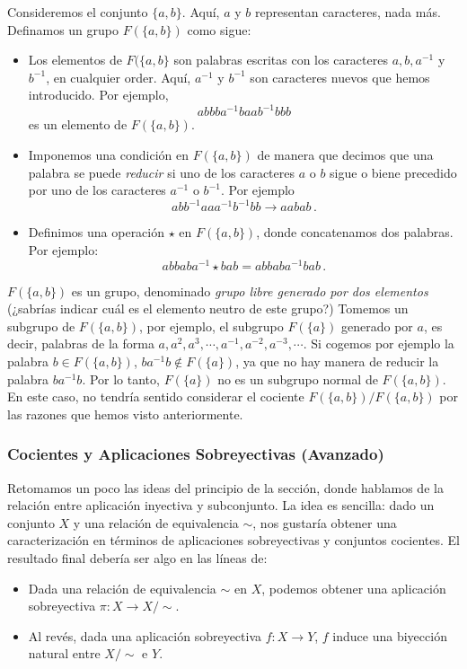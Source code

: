 \documentclass[a4paper,11pt]{amsart}
\theoremstyle{plain}
\theoremstyle{definition}
\theoremstyle{remark}
\begin{document}
Consideremos el conjunto $\{a, b\}$. Aquí, $a$ y $b$ representan caracteres, nada más. Definamos un grupo $F(\{a, b\})$ como sigue: 
\begin{itemize}
    \item Los elementos de $F(\{a, b\}$ son palabras escritas con los caracteres $a, b, a^{-1}$ y $b^{-1}$, en cualquier order. Aquí, $a^{-1}$ y $b^{-1}$ son caracteres nuevos que hemos introducido. Por ejemplo, 
    \[ abbba^{-1}baab^{-1}bbb \]
    es un elemento de $F(\{a, b\})$.
    \item Imponemos una condición en $F(\{a, b\})$ de manera que decimos que una palabra se puede \textit{reducir} si uno de los caracteres $a$ o $b$ sigue o biene precedido por uno de los caracteres $a^{-1}$ o $b^{-1}$. Por ejemplo 
    \[ abb^{-1}aaa^{-1}b^{-1}bb \to aabab \, .\]
    \item Definimos una operación $\star$ en $F(\{a, b\})$, donde concatenamos dos palabras. Por ejemplo: 
    \[ abbaba^{-1} \star bab = abbaba^{-1}bab \, .\]
\end{itemize}

$F(\{a,b \})$ es un grupo, denominado \textit{grupo libre generado por dos elementos} (¿sabrías indicar cuál es el elemento neutro de este grupo?) Tomemos un subgrupo de $F(\{ a, b \})$, por ejemplo, el subgrupo $F(\{a\})$ generado por $a$, es decir, palabras de la forma $a, a^2, a^3, \cdots , a^{-1}, a^{-2}, a^{-3}, \cdots $. Si cogemos por ejemplo la palabra $b \in F(\{a, b\})$, $b a^{-1} b \notin F(\{a\})$, ya que no hay manera de reducir la palabra $b a^{-1} b$. Por lo tanto, $F(\{a\})$ no es un subgrupo normal de $F(\{a, b\})$. En este caso, no tendría sentido considerar el cociente $F(\{a, b\})/F(\{a, b\})$ por las razones que hemos visto anteriormente. 



\subsubsection{Cocientes y Aplicaciones Sobreyectivas (Avanzado)}

Retomamos un poco las ideas del principio de la sección, donde hablamos de la relación entre aplicación inyectiva y subconjunto. La idea es sencilla: dado un conjunto $X$ y una relación de equivalencia $\sim$, nos gustaría obtener una caracterización en términos de aplicaciones sobreyectivas y conjuntos cocientes. El resultado final debería ser algo en las líneas de: 
\begin{itemize}
    \item Dada una relación de equivalencia $\sim$ en $X$, podemos obtener una aplicación sobreyectiva $\pi \colon X \to X / \sim$. 
    \item Al revés, dada una aplicación sobreyectiva $f \colon X \to Y$, $f$ induce una biyección natural entre $X/\sim$ e $Y$. 
\end{itemize}
\end{document}
